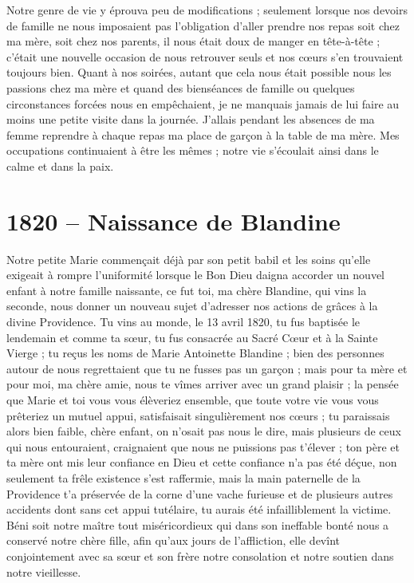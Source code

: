 \documentclass[11pt,a4paper]{report}
\begin{document}
Notre genre de vie y éprouva peu de modifications ; seulement lorsque nos devoirs de famille ne nous imposaient pas l'obligation d'aller prendre nos repas soit chez ma mère, soit chez nos parents, il nous était doux de manger en tête-à-tête ; c'était une nouvelle occasion de nous retrouver seuls et nos cœurs s'en trouvaient toujours bien. Quant à nos soirées, autant que cela nous était possible nous les passions chez ma mère et quand des bienséances de famille ou quelques circonstances forcées nous en empêchaient, je ne manquais jamais de lui faire au moins une petite visite dans la journée. J'allais pendant les absences de ma femme reprendre à chaque repas ma place de garçon à la table de ma mère. Mes occupations continuaient à être les mêmes ; notre vie s'écoulait ainsi dans le calme et dans la paix.

\section*{1820 -- Naissance de Blandine}

Notre petite Marie commençait déjà par son petit babil et les soins qu'elle exigeait à rompre l'uniformité lorsque le Bon Dieu daigna accorder un nouvel enfant à notre famille naissante, ce fut toi, ma chère Blandine, qui vins la seconde, nous donner un nouveau sujet d'adresser nos actions de grâces à la divine Providence. Tu vins au monde, le 13 avril 1820, tu fus baptisée le lendemain et comme ta sœur, tu fus consacrée au Sacré Cœur et à la Sainte Vierge ; tu reçus les noms de Marie Antoinette Blandine ; bien des personnes autour de nous regrettaient que tu ne fusses pas un garçon ; mais pour ta mère et pour moi, ma chère amie, nous te vîmes arriver avec un grand plaisir ; la pensée que Marie et toi vous vous élèveriez ensemble, que toute votre vie vous vous prêteriez un mutuel appui, satisfaisait singulièrement nos cœurs ; tu paraissais alors bien faible, chère enfant, on n'osait pas nous le dire, mais plusieurs de ceux qui nous entouraient, craignaient que nous ne puissions pas t'élever ; ton père et ta mère ont mis leur confiance en Dieu et cette confiance n'a pas été déçue, non seulement ta frêle existence s'est raffermie, mais la main paternelle de la Providence t'a préservée de la corne d'une vache furieuse et de plusieurs autres accidents dont sans cet appui tutélaire, tu aurais été infailliblement la victime. Béni soit notre maître tout miséricordieux qui dans son ineffable bonté nous a conservé notre chère fille, afin qu'aux jours de l'affliction, elle devînt conjointement avec sa sœur et son frère notre consolation et notre soutien dans notre vieillesse.
\end{document}
